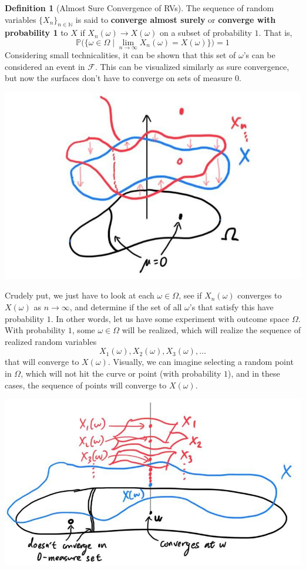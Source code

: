 \documentclass{article}
\theoremstyle{definition}
\theoremstyle{remark}
\theoremstyle{definition}
\newtheorem{definition}{Definition}[section]
\begin{document}
\begin{definition}[Almost Sure Convergence of RVs]
The sequence of random variables $\{ X_n\}_{n \in \mathbb{N}}$ is said to \textbf{converge almost surely} or \textbf{converge with probability 1} to $X$ if $X_n (\omega) \rightarrow X (\omega)$ on a subset of probability $1$. That is, 
\[\mathbb{P} \big( \{ \omega \in \Omega \mid \lim_{n \rightarrow \infty} X_n (\omega) = X(\omega) \} \big) = 1\]
Considering small technicalities, it can be shown that this set of $\omega$'s can be considered an event in $\mathcal{F}$. This can be visualized similarly as sure convergence, but now the surfaces don't have to converge on sets of measure $0$. 
\begin{center}
    \includegraphics[scale=0.3]{img/almost_sure_convergence.jpg}
\end{center}
Crudely put, we just have to look at each $\omega \in \Omega$, see if $X_n (\omega)$ converges to $X(\omega)$ as $n \rightarrow \infty$, and determine if the set of all $\omega$'s that satisfy this have probability $1$. In other words, let us have some experiment with outcome space $\Omega$. With probability $1$, some $\omega \in \Omega$ will be realized, which will realize the sequence of realized random variables
\[X_1 (\omega), X_2 (\omega), X_3 (\omega), \ldots \]
that will converge to $X(\omega)$. Visually, we can imagine selecting a random point in $\Omega$, which will not hit the curve or point (with probability $1$), and in these cases, the sequence of points will converge to $X(\omega)$. 
\begin{center}
    \includegraphics[scale=0.3]{img/almost_sure_convergence_2.jpg}
\end{center}
\end{definition}
\end{document}
